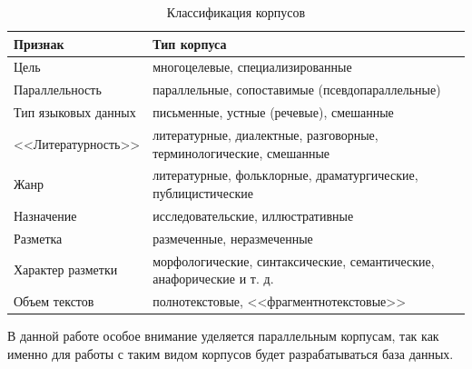 \begin{table}[H]
\centering
        \caption{Классификация корпусов \cite[с. 16]{cl}}
		\label{tab:coc}
        \begin{adjustbox}{width=\textwidth}
            \begin{tabular}{|p{}|p{}|}
        \hline
        Признак & Тип корпуса \\
        \hline
        \hline
        Цель & многоцелевые, специализированные \\
        \hline
        Параллельность & параллельные, сопоставимые (псевдопараллельные) \\
        \hline
        Тип языковых данных & письменные, устные (речевые), смешанные \\
        \hline
        <<Литературность>> & литературные, диалектные, разговорные, терминологические, смешанные \\
        \hline
        Жанр & литературные, фольклорные, драматургические, публицистические \\
        \hline
        Назначение & исследовательские, иллюстративные \\
        \hline
        Разметка & размеченные, неразмеченные \\
        \hline
        Характер разметки & морфологические, синтаксические, семантические, анафорические и т. д. \\
        \hline
        Объем текстов & полнотекстовые, <<фрагментнотекстовые>> \\
        \hline
		\end{tabular}
        \end{adjustbox}
\end{table}

\newpage

В данной работе особое внимание уделяется параллельным корпусам, так как именно для работы с таким видом корпусов будет разрабатываться база данных. %


